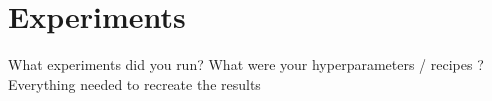 \section{Experiments}

What experiments did you run? What were your hyperparameters / recipes ? Everything needed to recreate the results
